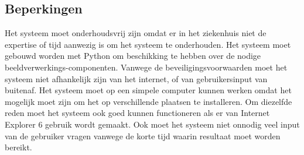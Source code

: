 \subsection{Beperkingen}
Het systeem moet onderhoudsvrij zijn omdat er in het ziekenhuis niet de expertise of tijd aanwezig is om het systeem te onderhouden.
Het systeem moet gebouwd worden met Python om beschikking te hebben over de nodige beeldverwerkings-componenten.
Vanwege de beveiligingsvoorwaarden moet het systeem niet afhankelijk zijn van het internet, of van gebruikersinput van buitenaf.
Het systeem moet op een simpele computer kunnen werken omdat het mogelijk moet zijn om het op verschillende plaatsen te installeren.
Om diezelfde reden moet het systeem ook goed kunnen functioneren als er van Internet Explorer 6 gebruik wordt gemaakt.
Ook moet het systeem niet onnodig veel input van de gebruiker vragen vanwege de korte tijd waarin resultaat moet worden bereikt.
